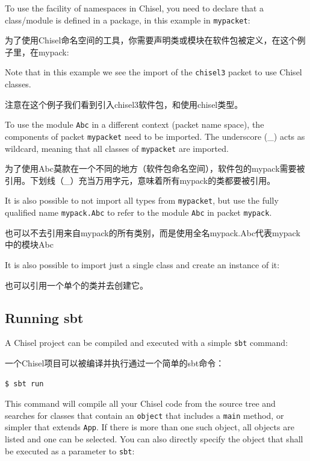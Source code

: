 \documentclass[%
    10pt,
    headinclude, footexclude,
    openright, %
    notitlepage,
    cleardoubleempty,
    headsepline,
    pointlessnumbers,
    bibtotoc, idxtotoc,
    ]{scrbook}
\newcommand{\code}[1]{{\small{\texttt{#1}}}}
\begin{document}
To use the facility of namespaces in Chisel, you need to declare that a class/module
is defined in a package, in this example in \code{mypacket}:

为了使用Chisel命名空间的工具，你需要声明类或模块在软件包被定义，在这个例子里，在mypack:


\noindent Note that in this example we see the import of the \code{chisel3} packet
to use Chisel classes.

注意在这个例子我们看到引入chisel3软件包，和使用chisel类型。

To use the module \code{Abc} in a different context (packet name space),
the components of packet \code{mypacket} need to be imported. The underscore
(\_) acts as wildcard, meaning that all classes of \code{mypacket} are imported.

为了使用Abc莫款在一个不同的地方（软件包命名空间），软件包的mypack需要被引用。下划线（_）充当万用字元，意味着所有mypack的类都要被引用。



\noindent It is also possible to not import all types from \code{mypacket},
but use the fully qualified name \code{mypack.Abc} to refer to the module
\code{Abc} in packet \code{mypack}.

也可以不去引用来自mypack的所有类别，而是使用全名mypack.Abc代表mypack中的模块Abc


\noindent It is also possible to import just a single class and create an instance of it:

也可以引用一个单个的类并去创建它。



\subsection{Running sbt}

A Chisel project can be compiled and executed with a simple \code{sbt} command:

一个Chisel项目可以被编译并执行通过一个简单的sbt命令：

\begin{verbatim}
$ sbt run
\end{verbatim}

This command will compile all your Chisel code from the source tree and searches
for classes that contain an \code{object} that includes a \code{main} method, or simpler
that extends \code{App}. If there is more than one such object, all objects are listed and
one can be selected.
You can also directly specify the object that shall be executed as a parameter to \code{sbt}:
\end{document}
